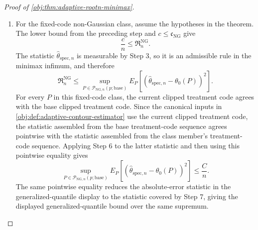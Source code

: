 \begin{proof}[Proof of \cref{obj:thm:adaptive-rootn-minimax}]
\begin{enumerate}
For a nonempty fixed-code JMS ACE class, the separate fixed-code ACE converse applies the same two-point argument starting from a law in that JMS ACE class.  The affine perturbations preserve JMS ACE membership, the target values \(\theta_-\) and \(\theta_+\), the law of \((X,T)\), the nuisance functions \(g_0,q_0\), the treatment innovation \(\eta\), and both clipped supplied codes; this is the JMS ACE branch of \cref{obj:lem:non-gaussian-hard-submodel}.  The same product relative-entropy calculation and Le Cam inequality give a constant \(\mathfrak c_{\mathrm{JMS}}>0\), depending only on the primitive tuple, such that
\[
\frac{\mathfrak c_{\mathrm{JMS}}}{n}
\le
\inf_{\widetilde\theta}
\sup_{P\in\mathcal P_{\mathrm{ACE},n}^{\mathrm{JMS}}(p;\mathrm{base})}
E_P\!\left[(\widetilde\theta-\theta_0(P))^2\right].
\]

\item For the fixed-code non-Gaussian class, assume the hypotheses in the theorem.  The lower bound from the preceding step and \(c\le\mathfrak c_{\mathrm{NG}}\) give
\[
\frac{c}{n}\le \mathfrak R_n^{\mathrm{NG}}.
\]
The statistic \(\widehat\theta_{\mathrm{spec},n}\) is measurable by Step 3, so it is an admissible rule in the minimax infimum, and therefore
\[
\mathfrak R_n^{\mathrm{NG}}
\le
\sup_{P\in\mathcal P_{\mathrm{NG},n}(p;\mathrm{base})}
E_P\!\left[
(\widehat\theta_{\mathrm{spec},n}-\theta_0(P))^2
\right].
\]
For every \(P\) in this fixed-code class, the current clipped treatment code agrees with the base clipped treatment code.  Since the canonical inputs in \cref{obj:def:adaptive-contour-estimator} use the current clipped treatment code, the statistic assembled from the base treatment-code sequence agrees pointwise with the statistic assembled from the class member's treatment-code sequence.  Applying Step 6 to the latter statistic and then using this pointwise equality gives
\[
\sup_{P\in\mathcal P_{\mathrm{NG},n}(p;\mathrm{base})}
E_P\!\left[
(\widehat\theta_{\mathrm{spec},n}-\theta_0(P))^2
\right]
\le
\frac{C}{n}.
\]
The same pointwise equality reduces the absolute-error statistic in the generalized-quantile display to the statistic covered by Step 7, giving the displayed generalized-quantile bound over the same supremum. %


\end{enumerate}
\end{proof}
